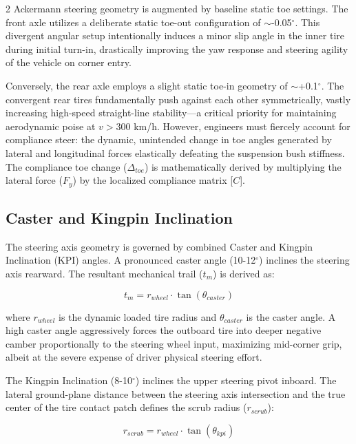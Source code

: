 \begin{multicols}{2}
Ackermann steering geometry is augmented by baseline static toe settings. The front axle utilizes a deliberate static toe-out configuration of $\sim$-0.05$^\circ$. This divergent angular setup intentionally induces a minor slip angle in the inner tire during initial turn-in, drastically improving the yaw response and steering agility of the vehicle on corner entry. 

Conversely, the rear axle employs a slight static toe-in geometry of $\sim$+0.1$^\circ$. The convergent rear tires fundamentally push against each other symmetrically, vastly increasing high-speed straight-line stability—a critical priority for maintaining aerodynamic poise at $v > 300$ km/h. However, engineers must fiercely account for compliance steer: the dynamic, unintended change in toe angles generated by lateral and longitudinal forces elastically defeating the suspension bush stiffness. The compliance toe change ($\Delta_{toe}$) is mathematically derived by multiplying the lateral force ($F_y$) by the localized compliance matrix [$C$].

\subsection{Caster and Kingpin Inclination}

The steering axis geometry is governed by combined Caster and Kingpin Inclination (KPI) angles. A pronounced caster angle (10-12$^\circ$) inclines the steering axis rearward. The resultant mechanical trail ($t_m$) is derived as:

\begin{equation} \label{eq:mechanical_trail}
t_m = r_{wheel} \cdot \tan(\theta_{caster})
\end{equation}

where $r_{wheel}$ is the dynamic loaded tire radius and $\theta_{caster}$ is the caster angle. A high caster angle aggressively forces the outboard tire into deeper negative camber proportionally to the steering wheel input, maximizing mid-corner grip, albeit at the severe expense of driver physical steering effort.

The Kingpin Inclination (8-10$^\circ$) inclines the upper steering pivot inboard. The lateral ground-plane distance between the steering axis intersection and the true center of the tire contact patch defines the scrub radius ($r_{scrub}$):

\begin{equation} \label{eq:scrub_radius}
r_{scrub} = r_{wheel} \cdot \tan(\theta_{kpi})
\end{equation}


\end{multicols}
